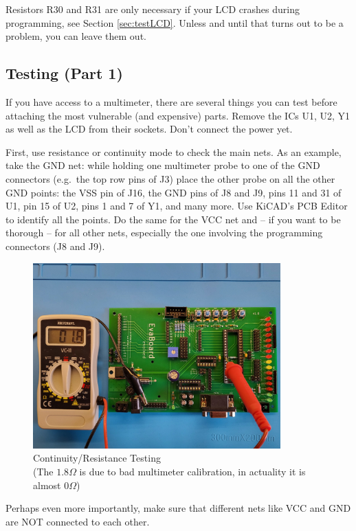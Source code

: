 \documentclass{article}
\begin{document}
Resistors R30 and R31 are only necessary if your LCD crashes during programming, see Section \ref{sec:testLCD}. Unless and until that turns out to be a problem, you can leave them out. 
\FloatBarrier

\subsection{Testing (Part 1)}\label{sec:testingHardware}
If you have access to a multimeter, there are several things you can test before attaching the most vulnerable (and expensive) parts. Remove the ICs U1, U2, Y1 as well as the LCD from their sockets. Don't connect the power yet. 

First, use resistance or continuity mode to check the main nets. As an example, take the GND net: while holding one multimeter probe to one of the GND connectors (e.g.\ the top row pins of J3) place the other probe on all the other GND points: the VSS pin of J16, the GND pins of J8 and J9, pins 11 and 31 of U1, pin 15 of U2, pins 1 and 7 of Y1, and many more. Use KiCAD's PCB Editor to identify all the points. Do the same for the VCC net and -- if you want to be thorough -- for all other nets, especially the one involving the programming connectors (J8 and J9). 
\begin{figure}[htb]
\centering
\includegraphics[width=0.85\textwidth]{Pictures/Testing1.jpg}
\caption{Continuity/Resistance Testing\\(The $1.8\Omega$ is due to bad multimeter calibration, in actuality it is almost $0\Omega$)}
\label{fig:testing1}
\end{figure}

Perhaps even more importantly, make sure that different nets like VCC and GND are NOT connected to each other. 
\end{document}
